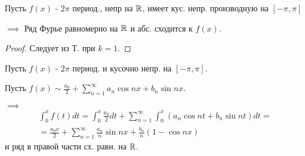 \documentclass{article}
\begin{document}
\begin{corollary}
  Пусть $f(x)$ - $2\pi$ период., непр на $\mathbb{R}$, имеет кус. непр.
  производную на $[-\pi,\pi]$

  $\implies$ Ряд Фурье равномерно на $\mathbb{R}$ и абс. сходится к $f(x)$.
\end{corollary}
\begin{proof}
  Следует из Т. при $k=1$.
\end{proof}

\begin{theorem}
  Пусть $f(x)$ - $2\pi$ период. и кусочно непр. на $[-\pi, \pi]$.

  Пусть $f(x) \sim \frac{a_0}{2}+\sum_{n=1}^{\infty}a_n\cos nx + b_n \sin nx$.

  $\implies$
  \begin{gather*}
    \int_{0}^{x}f(t)dt=\int_{0}^{x}\frac{a_0}{2}dt+\sum_{n=1}^{\infty}\int_{0}^{x}(a_n\cos nt + b_n\sin nt)dt = \\
    = \frac{a_0x}{2}+\sum_{n=1}^{\infty}\frac{a_n}{n}\sin nx + \frac{b_n}{n}(1-\cos nx)
  \end{gather*}
  и ряд в правой части сх. равн. на $\mathbb{R}$.

\end{theorem}
\end{document}
